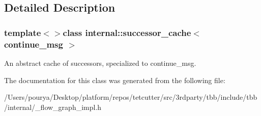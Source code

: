 \subsection{Detailed Description}
\subsubsection*{template$<$$>$class internal\+::successor\+\_\+cache$<$ continue\+\_\+msg $>$}

An abstract cache of successors, specialized to continue\+\_\+msg. 

The documentation for this class was generated from the following file\+:\begin{DoxyCompactItemize}
\item 
/\+Users/pourya/\+Desktop/platform/repos/tetcutter/src/3rdparty/tbb/include/tbb/internal/\+\_\+flow\+\_\+graph\+\_\+impl.\+h\end{DoxyCompactItemize}
